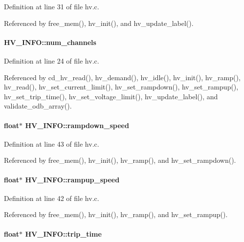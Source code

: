 Definition at line 31 of file hv.c.

Referenced by free\_\-mem(), hv\_\-init(), and hv\_\-update\_\-label().
\paragraph[{num\_\-channels}]{ {\bf HV\_\-INFO::num\_\-channels}}\hfill\label{structHV__INFO_aeb36315d8c77519e4e855a32174fb190}


Definition at line 24 of file hv.c.

Referenced by cd\_\-hv\_\-read(), hv\_\-demand(), hv\_\-idle(), hv\_\-init(), hv\_\-ramp(), hv\_\-read(), hv\_\-set\_\-current\_\-limit(), hv\_\-set\_\-rampdown(), hv\_\-set\_\-rampup(), hv\_\-set\_\-trip\_\-time(), hv\_\-set\_\-voltage\_\-limit(), hv\_\-update\_\-label(), and validate\_\-odb\_\-array().
\paragraph[{rampdown\_\-speed}]{\setlength{\rightskip}{0pt plus 5cm}float$\ast$ {\bf HV\_\-INFO::rampdown\_\-speed}}\hfill\label{structHV__INFO_ac662201b0d4ab12fa2603e8cf9a98d64}


Definition at line 43 of file hv.c.

Referenced by free\_\-mem(), hv\_\-init(), hv\_\-ramp(), and hv\_\-set\_\-rampdown().
\paragraph[{rampup\_\-speed}]{\setlength{\rightskip}{0pt plus 5cm}float$\ast$ {\bf HV\_\-INFO::rampup\_\-speed}}\hfill\label{structHV__INFO_a582f1fa8277448a56a6bff022655f220}


Definition at line 42 of file hv.c.

Referenced by free\_\-mem(), hv\_\-init(), hv\_\-ramp(), and hv\_\-set\_\-rampup().
\paragraph[{trip\_\-time}]{\setlength{\rightskip}{0pt plus 5cm}float$\ast$ {\bf HV\_\-INFO::trip\_\-time}}\hfill\label{structHV__INFO_a399d84bfe53e9ebf05376371258bf076}


